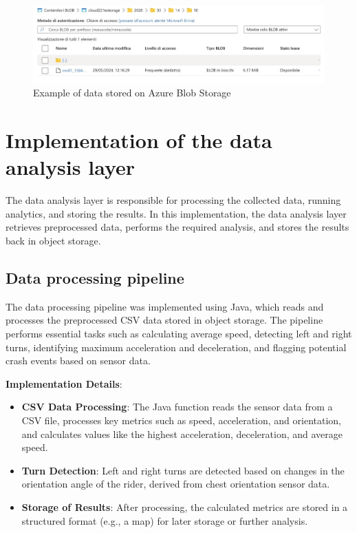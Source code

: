\begin{figure}[htbp]
    \centering
    \includegraphics[width=1\textwidth]{Immagini/azure_storage.png}
    \caption{Example of data stored on Azure Blob Storage}
    \label{fig:azure_obj_storage}
\end{figure}


\section{Implementation of the data analysis layer}
\label{sec:implementation_data_analysis}

The data analysis layer is responsible for processing the collected data, running analytics, and storing the results. In this implementation, the data analysis layer retrieves preprocessed data, performs the required analysis, and stores the results back in object storage.

\subsection{Data processing pipeline}
\label{sec:data_processing_pipeline}

The data processing pipeline was implemented using Java, which reads and processes the preprocessed CSV data stored in object storage. The pipeline performs essential tasks such as calculating average speed, detecting left and right turns, identifying maximum acceleration and deceleration, and flagging potential crash events based on sensor data.

\textbf{Implementation Details}:
\begin{itemize}
    \item \textbf{CSV Data Processing}: The Java function reads the sensor data from a CSV file, processes key metrics such as speed, acceleration, and orientation, and calculates values like the highest acceleration, deceleration, and average speed.
    \item \textbf{Turn Detection}: Left and right turns are detected based on changes in the orientation angle of the rider, derived from chest orientation sensor data. 
    \item \textbf{Storage of Results}: After processing, the calculated metrics are stored in a structured format (e.g., a map) for later storage or further analysis.
\end{itemize}

